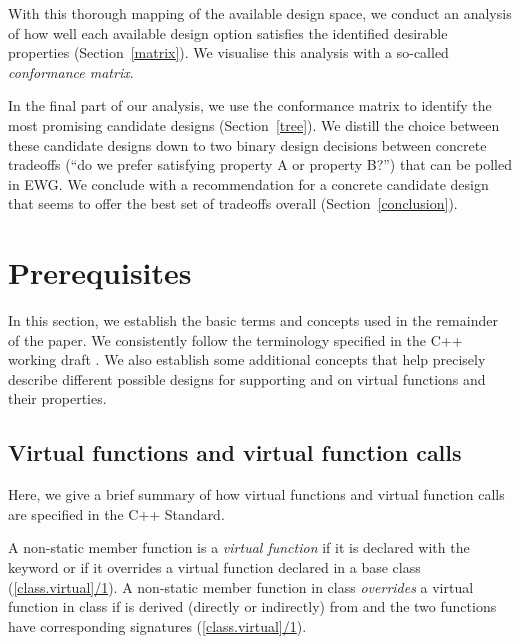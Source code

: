 With this thorough mapping of the available design space, we conduct an analysis of how well each available design option satisfies the identified desirable properties (Section~\ref{matrix}). We visualise this analysis with a so-called \emph{conformance matrix}. 

In the final part of our analysis, we use the conformance matrix to identify the most promising candidate designs (Section~\ref{tree}). We distill the choice between these candidate designs down to two binary design decisions between concrete tradeoffs (``do we prefer satisfying property A or property B?'') that can be polled in EWG. We conclude with a recommendation for a concrete candidate design that seems to offer the best set of tradeoffs overall (Section~\ref{conclusion}).

\section{Prerequisites}
\label{prerequisites}


In this section, we establish the basic terms and concepts used in the remainder of the paper. We consistently follow the terminology specified in the C++ working draft \cite{N5014}. We also establish some additional concepts that help precisely describe different possible designs for supporting  and  on virtual functions and their properties.

\subsection{Virtual functions and virtual function calls}

Here, we give a brief summary of how virtual functions and virtual function calls are specified in the C++ Standard.

A non-static member function is a \emph{virtual function} if it is declared with the keyword  or if it overrides a virtual function declared in a base class (\href{https://eel.is/c++draft/class.virtual#1}{[class.virtual]/1}). A non-static member function  in class  \emph{overrides} a virtual function  in class  if  is derived (directly or indirectly) from  and the two functions have corresponding signatures (\href{https://eel.is/c++draft/class.virtual#2.sentence-1}{[class.virtual]/1}).


